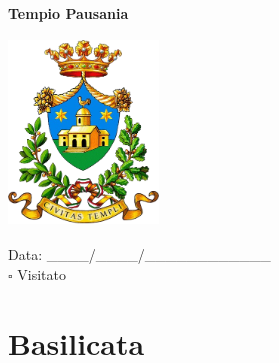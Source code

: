 \documentclass[a5paper,12pt]{article}
\begin{document}
\vspace{0.7cm}

\noindent
\begin{minipage}[t]{0.45\textwidth}
    \begin{center}
        \textbf{Tempio Pausania}
    \end{center}
    \vspace{-0.4cm} %
    \begin{center}
        \includegraphics[height= 5cm, width=4cm]{Sardegna/Stemma Tempio Pausania.png}
    \end{center}
    \vspace{-0.5cm} %
    \begin{flushleft}
        Data: \_\_\_\_/\_\_\_\_/\_\_\_\_\_\_\_\_\_\_\_\_ \\
        $\square$ Visitato
    \end{flushleft}
\end{minipage}

\newpage

\section*{Basilicata}

\newpage
\end{document}

